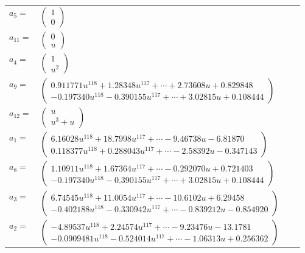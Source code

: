 \documentclass[1p]{elsarticle_modified}
\theoremstyle{definition}
\begin{document}
\begin{tabular}{m{7pt} m{180pt} m{7pt} m{180pt} }
\flushright $a_{5}=$&$\begin{pmatrix}1\\0\end{pmatrix}$ \\
\flushright $a_{11}=$&$\begin{pmatrix}0\\u\end{pmatrix}$ \\
\flushright $a_{4}=$&$\begin{pmatrix}1\\u^2\end{pmatrix}$ \\
\flushright $a_{9}=$&$\begin{pmatrix}0.911771 u^{118}+1.28348 u^{117}+\cdots+2.73608 u+0.829848\\-0.197340 u^{118}-0.390155 u^{117}+\cdots+3.02815 u+0.108444\end{pmatrix}$ \\
\flushright $a_{12}=$&$\begin{pmatrix}u\\u^3+u\end{pmatrix}$ \\
\flushright $a_{1}=$&$\begin{pmatrix}6.16028 u^{118}+18.7998 u^{117}+\cdots-9.46738 u-6.81870\\0.118377 u^{118}+0.288043 u^{117}+\cdots-2.58392 u-0.347143\end{pmatrix}$ \\
\flushright $a_{8}=$&$\begin{pmatrix}1.10911 u^{118}+1.67364 u^{117}+\cdots-0.292070 u+0.721403\\-0.197340 u^{118}-0.390155 u^{117}+\cdots+3.02815 u+0.108444\end{pmatrix}$ \\
\flushright $a_{3}=$&$\begin{pmatrix}6.74545 u^{118}+11.0054 u^{117}+\cdots-10.6102 u+6.29458\\-0.402188 u^{118}-0.330942 u^{117}+\cdots-0.839212 u-0.854920\end{pmatrix}$ \\
\flushright $a_{2}=$&$\begin{pmatrix}-4.89537 u^{118}+2.24574 u^{117}+\cdots-9.23476 u-13.1781\\-0.0909481 u^{118}-0.524014 u^{117}+\cdots-1.06313 u+0.256362\end{pmatrix}$ \\

\end{tabular}
\end{document}
